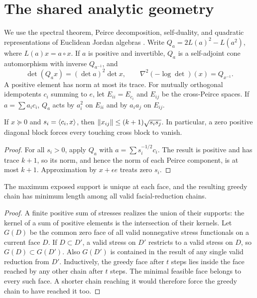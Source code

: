 \section{The shared analytic geometry}\label{sec:geometry}
We use the spectral theorem, Peirce decomposition, self-duality, and quadratic representations of Euclidean Jordan algebras \cite{FK94}. Write $Q_a=2L(a)^2-L(a^2)$, where $L(a)x=a\circ x$. If $a$ is positive and invertible, $Q_a$ is a self-adjoint cone automorphism with inverse $Q_{a^{-1}}$, and
\[
 \det(Q_ax)=(\det a)^2\det x,\qquad
 \nabla^2(-\log\det)(x)=Q_{x^{-1}}.
\]
A positive element has norm at most its trace. For mutually orthogonal idempotents $c_i$ summing to $e$, let $E_{ii}=E_{c_i}$ and $E_{ij}$ be the cross-Peirce spaces. If $a=\sum a_i c_i$, $Q_a$ acts by $a_i^2$ on $E_{ii}$ and by $a_i a_j$ on $E_{ij}$.

\begin{lemma}\label{lem:block}
If $x\succeq0$ and $s_i=\langle c_i,x\rangle$, then $\lVert x_{ij}\rVert\le(k+1)\sqrt{s_i s_j}$. In particular, a zero positive diagonal block forces every touching cross block to vanish.
\end{lemma}
\begin{proof}
For all $s_i>0$, apply $Q_a$ with $a=\sum s_i^{-1/2}c_i$. The result is positive and has trace $k+1$, so its norm, and hence the norm of each Peirce component, is at most $k+1$. Approximation by $x+\epsilon e$ treats zero $s_i$.
\end{proof}

\begin{lemma}\label{lem:greedy}
The maximum exposed support is unique at each face, and the resulting greedy chain has minimum length among all valid facial-reduction chains.
\end{lemma}
\begin{proof}
A finite positive sum of stresses realizes the union of their supports: the kernel of a sum of positive elements is the intersection of their kernels. Let $G(D)$ be the common zero face of all valid nonnegative stress functionals on a current face $D$. If $D\subset D'$, a valid stress on $D'$ restricts to a valid stress on $D$, so $G(D)\subset G(D')$. Also $G(D')$ is contained in the result of any single valid reduction from $D'$. Inductively, the greedy face after $t$ steps lies inside the face reached by any other chain after $t$ steps. The minimal feasible face belongs to every such face. A shorter chain reaching it would therefore force the greedy chain to have reached it too.
\end{proof}

